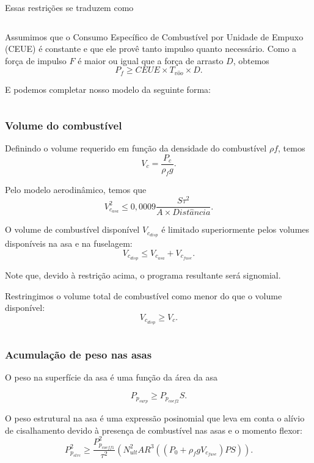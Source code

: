 Essas restrições se traduzem como

\inputminted{python}{../Exemplos/Cap15/prog1_wlm.py}


Assumimos que o Consumo Específico de Combustível por Unidade de
Empuxo (CEUE) é constante e que ele provê tanto impulso quanto
necessário. Como a força de impulso $F$ é maior ou igual que a força
de arrasto $D$, obtemos
\[
  P_f \geq CEUE \times T_{v\hat{o}o} \times D.
\]

E podemos completar nosso modelo da seguinte forma:

\inputminted{python}{../Exemplos/Cap15/prog2_tdm.py}

\subsubsection{Volume do combustível}

Definindo o volume requerido em função da densidade do combustível
$\rho f$, temos
\[
  V_c = \frac{P_c}{\rho_f g}.
\]

Pelo modelo aerodinâmico, temos que
\[
  V_{c_{asa}}^2 \leq 0,0009\frac{S\tau^2}{A \times Dist\hat{a}ncia}.
\]

O volume de combustível disponível $V_{c_{disp}}$ é limitado
superiormente pelos volumes disponíveis na asa e na fuselagem:
\[
  V_{c_{disp}} \leq V_{c_{asa}}+ V_{c_{fuse}}.
\]

\noindent Note que, devido à restrição acima, o programa resultante
será signomial.

Restringimos o volume total de combustível como menor do que o volume
disponível:
\[
  V_{c_{disp}} \geq V_c.
\]

\inputminted{python}{../Exemplos/Cap15/prog3_fvm.py}

\subsubsection{Acumulação de peso nas asas}

O peso na superfície da asa é uma função da área da asa

\[
  P_{p_{surp}} \geq P_{p_{coef2}}S.
\]

O peso estrutural na asa é uma expressão posinomial que leva em conta
o alívio de cisalhamento devido à presença de combustível nas asas e o
momento flexor:
\[
  P_{p_{strc}}^2 \geq \frac{P_{p_{coeff1}}^2}{\tau^2}(N_{ult}^2
  AR^3((P_0 + \rho_f g V_{c_{fuse}})PS)).
\]


